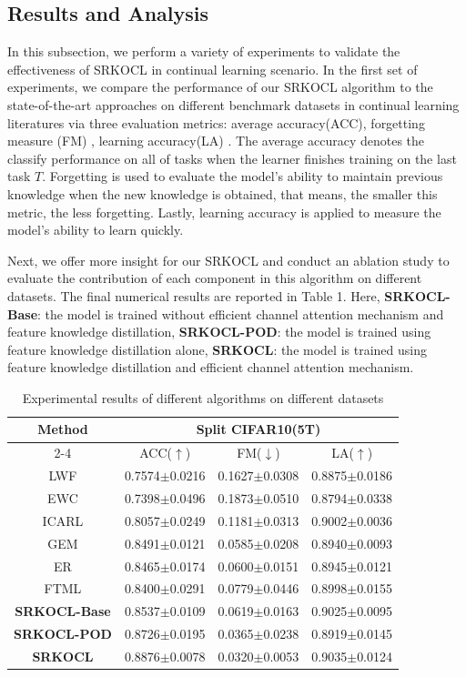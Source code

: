 \documentclass[review]{elsarticle}
\begin{document}
\subsection{Results and Analysis}

In this subsection, we perform a variety of experiments to validate the effectiveness of SRKOCL in continual learning scenario. In the first set of experiments, we compare the performance of our SRKOCL algorithm to the state-of-the-art approaches on different benchmark datasets in continual learning literatures via three evaluation metrics: average accuracy(ACC), forgetting measure (FM) \cite{14lopez2017gradient}, learning accuracy(LA) \cite{24riemer2018learning}. The average accuracy denotes the classify performance on all of tasks when the learner finishes training on the last task $T$. Forgetting is used to evaluate the model’s ability to maintain previous knowledge when the new knowledge is obtained, that means, the smaller this metric, the less forgetting. Lastly, learning accuracy is applied to measure the model’s ability to learn quickly.

Next, we offer more insight for our SRKOCL and conduct an ablation study to evaluate the contribution of each component in this algorithm on different datasets. The final numerical results are reported in Table 1. Here, \textbf{SRKOCL-Base}: the model is trained without efficient channel attention mechanism and feature knowledge distillation, \textbf{SRKOCL-POD}: the model is trained using feature knowledge distillation alone, \textbf{SRKOCL}: the model is trained using feature knowledge distillation and efficient channel attention mechanism.

\begin{table}[!htbp]
	\centering
	\caption{Experimental results of different algorithms on different datasets}
	\begin{tabular}{cccc}
		\hline
		\multirow{2}{*}{Method} & \multicolumn{3}{c}{Split CIFAR10(5T)}\\ \cline{2-4}
	&ACC($ \uparrow $)	 &FM($ \downarrow $) &LA($ \uparrow $)	
\\ \hline
LWF	&0.7574$ \pm $0.0216	 &0.1627$ \pm $0.0308	&0.8875$ \pm $0.0186 \\
EWC	&0.7398$ \pm $0.0496	&0.1873$ \pm $0.0510	 &0.8794$ \pm $0.0338 \\
ICARL	 &0.8057$ \pm $0.0249
	&0.1181$ \pm $0.0313	 &0.9002$ \pm $0.0036 \\
GEM	&0.8491$ \pm $0.0121	&0.0585$ \pm $0.0208	&0.8940$ \pm $0.0093 \\
ER	&0.8465$ \pm $0.0174	 &0.0600$ \pm $0.0151	&0.8945$ \pm $0.0121 \\
FTML	&0.8400$ \pm $0.0291	 &0.0779$ \pm $0.0446	 &0.8998$ \pm $0.0155 \\ \hline
\textbf{SRKOCL-Base}	&0.8537$ \pm $0.0109	 &0.0619$ \pm $0.0163	&0.9025$ \pm $0.0095 \\
\textbf{SRKOCL-POD}	&0.8726$ \pm $0.0195	 &0.0365$ \pm $0.0238	&0.8919$ \pm $0.0145 \\
\textbf{SRKOCL}	&0.8876$ \pm $0.0078	 &0.0320$ \pm $0.0053	&0.9035$ \pm $0.0124 \\ \hline
	\end{tabular}
\end{table}
\end{document}
